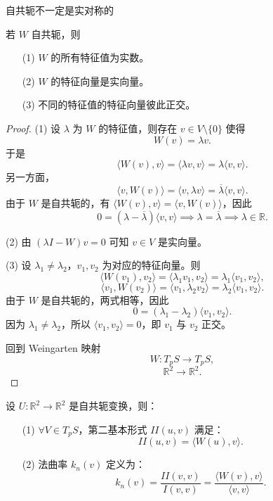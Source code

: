 \documentclass[lang=cn,10pt,thmcnt=section]{elegantbook}
\begin{document}
    \begin{remark}
        自共轭不一定是实对称的
    \end{remark}
    \begin{proposition}
    若 $W$ 自共轭，则
    \begin{enumerate}
        \item[(1)] $W$ 的所有特征值为实数。
        \item[(2)] $W$ 的特征向量是实向量。
        \item[(3)] 不同的特征值的特征向量彼此正交。
    \end{enumerate}
    \end{proposition}
    \begin{proof}
        (1) 设 $\lambda$ 为 $W$ 的特征值，则存在 $v \in V \setminus \{0\}$ 使得
        \[
        W(v) = \lambda v.
        \]
        于是
        \[
        \langle W(v), v \rangle = \langle \lambda v, v \rangle = \lambda \langle v, v \rangle.
        \]
        另一方面，
        \[
        \langle v, W(v) \rangle = \langle v, \lambda v \rangle = \overline{\lambda} \langle v, v \rangle.
        \]
        由于 $W$ 是自共轭的，有 $\langle W(v), v \rangle = \langle v, W(v) \rangle$，因此
        \[
        0 = (\lambda - \overline{\lambda}) \langle v, v \rangle \implies \lambda = \overline{\lambda} \implies \lambda \in \mathbb{R}.
        \]
        
        (2) 由 $(\lambda I - W)v = 0$ 可知 $v \in V$ 是实向量。
        
        (3) 设 $\lambda_1 \neq \lambda_2$，$v_1, v_2$ 为对应的特征向量。则
        \[
        \langle W(v_1), v_2 \rangle = \langle \lambda_1 v_1, v_2 \rangle = \lambda_1 \langle v_1, v_2 \rangle,
        \]
        \[
        \langle v_1, W(v_2) \rangle = \langle v_1, \lambda_2 v_2 \rangle = \lambda_2 \langle v_1, v_2 \rangle.
        \]
        由于 $W$ 是自共轭的，两式相等，因此
        \[
        0 = (\lambda_1 - \lambda_2) \langle v_1, v_2 \rangle.
        \]
        因为 $\lambda_1 \neq \lambda_2$，所以 $\langle v_1, v_2 \rangle = 0$，即 $v_1$ 与 $v_2$ 正交。
        
        回到 Weingarten 映射
        \[
        W \colon T_p S \to T_p S,
        \]
        \[
        \mathbb{R}^2 \to \mathbb{R}^2.
        \]
        \end{proof}

        \begin{proposition}
            设 $U \colon \mathbb{R}^2 \to \mathbb{R}^2$ 是自共轭变换，则：
            \begin{enumerate}
                \item[(1)] $\forall V \in T_pS$，第二基本形式 $II(u,v)$ 满足：
                \[
                II(u,v) = \langle W(u), v \rangle.
                \]
                
                \item[(2)] 法曲率 $k_n(v)$ 定义为：
                \[
                k_n(v) = \frac{II(v, v)}{I(v,v)} = \frac{\langle W(v), v \rangle}{\langle v, v \rangle}.
                \]
                
            \end{enumerate}
            \end{proposition}
            
\end{document}
